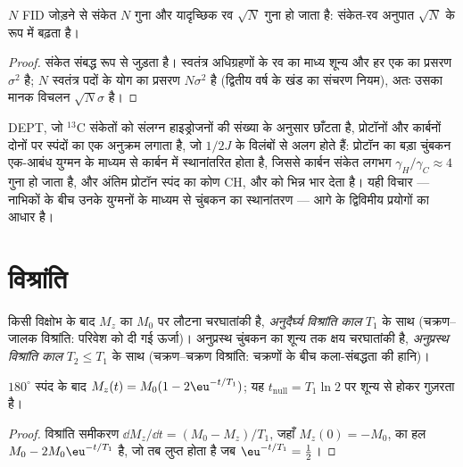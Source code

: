 \begin{proposition}[संकेत औसतन]\label{prop:b3:advanced-nmr:averaging}
$N$ FID जोड़ने से संकेत $N$ गुना और यादृच्छिक रव $\sqrt N$ गुना हो जाता है:
संकेत-रव अनुपात $\sqrt N$ के रूप में बढ़ता है।
\end{proposition}

\begin{proof}
संकेत संबद्ध रूप से जुड़ता है। स्वतंत्र अधिग्रहणों के रव का माध्य शून्य
और हर एक का प्रसरण $\sigma^2$ है; $N$ स्वतंत्र पदों के योग का प्रसरण
$N\sigma^2$ है (द्वितीय वर्ष के खंड का संचरण नियम), अतः उसका मानक विचलन
$\sqrt N\sigma$ है।
\end{proof}

DEPT, जो ${}^{13}$C संकेतों को संलग्न हाइड्रोजनों की संख्या के अनुसार छाँटता है,
प्रोटॉनों और कार्बनों दोनों पर स्पंदों का एक अनुक्रम लगाता है, जो
$1/2J$ के विलंबों से अलग होते हैं: प्रोटॉन का बड़ा चुंबकन एक-आबंध युग्मन के माध्यम से
कार्बन में स्थानांतरित होता है, जिससे कार्बन संकेत लगभग
$\gamma_H/\gamma_C \approx 4$ गुना हो जाता है, और अंतिम प्रोटॉन स्पंद का कोण CH,  और
 को भिन्न भार देता है। यही विचार --- नाभिकों के बीच उनके युग्मनों के माध्यम से
चुंबकन का स्थानांतरण --- आगे के द्विविमीय प्रयोगों का आधार है।

\section{विश्रांति}

\begin{definition}[अनुदैर्घ्य और अनुप्रस्थ विश्रांति काल]\label{def:b3:advanced-nmr:relaxation}
किसी विक्षोभ के बाद $M_z$ का $M_0$ पर लौटना चरघातांकी है,
\emph{अनुदैर्घ्य विश्रांति काल} $T_1$ के साथ
(चक्रण--जालक विश्रांति: परिवेश को दी गई ऊर्जा)। अनुप्रस्थ चुंबकन का
शून्य तक क्षय चरघातांकी है,
\emph{अनुप्रस्थ विश्रांति काल} $T_2 \le T_1$ के साथ
(चक्रण--चक्रण विश्रांति: चक्रणों के बीच कला-संबद्धता की हानि)।
\end{definition}

\begin{proposition}[प्रतिलोमन पुनःप्राप्ति]\label{prop:b3:advanced-nmr:inversion-recovery}
$180^\circ$ स्पंद के बाद $M_z(t) = M_0(1 - 2\eu^{-t/T_1})$; यह
$t_{\mathrm{null}} = T_1\ln2$ पर शून्य से होकर गुज़रता है।
\end{proposition}

\begin{proof}
विश्रांति समीकरण $\dd M_z/\dd t = (M_0 - M_z)/T_1$, जहाँ $M_z(0) = -M_0$, का
हल $M_0 - 2M_0\eu^{-t/T_1}$ है, जो तब लुप्त होता है जब $\eu^{-t/T_1} = \frac12$।
\end{proof}

